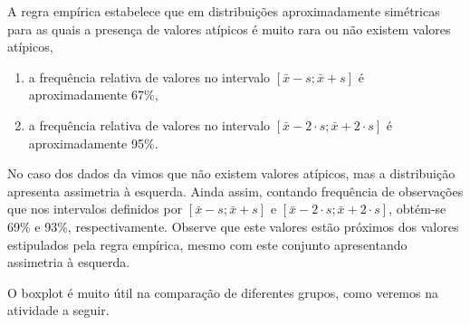 A regra empírica estabelece que em distribuições aproximadamente simétricas para as quais a presença de valores atípicos é muito rara ou não existem valores atípicos,
\begin{enumerate}
\item {} 
a frequência relativa de valores no intervalo \([\bar{x}-s;\bar{x}+s]\) é aproximadamente 67\%,

\item {} 
a frequência relativa de valores no intervalo \([\bar{x}-2\cdot s; \bar{x}+2\cdot s]\) é aproximadamente 95\%.

\end{enumerate}

No caso dos dados da  vimos que não existem valores atípicos, mas a distribuição apresenta assimetria à esquerda. Ainda assim, contando frequência de observações que nos intervalos definidos por \([\bar{x}-s;\bar{x}+s]\) e  \([\bar{x}-2\cdot s; \bar{x}+2\cdot s]\),  obtém-se 69\% e 93\%, respectivamente. Observe que este valores estão próximos dos valores estipulados pela regra empírica, mesmo com este conjunto apresentando assimetria à esquerda.

O boxplot é muito útil na comparação de diferentes grupos, como veremos na atividade a seguir.


\practice{ }
\label{\detokenize{PE104-7:sec-praticando3}}\label{\detokenize{PE104-7::doc}}\label{\detokenize{PE104-7:praticando}}

